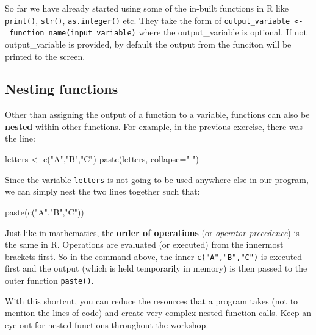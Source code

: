 \documentclass[a4paper]{book}
\newenvironment{Shaded}{}{}
\newcommand{\KeywordTok}[1]{\textcolor[rgb]{0.00,0.00,1.00}{{#1}}}
\newcommand{\DataTypeTok}[1]{{#1}}
\newcommand{\StringTok}[1]{\textcolor[rgb]{0.00,0.50,0.50}{{#1}}}
\newcommand{\NormalTok}[1]{{#1}}
\newlength{\leftbarwidth}
\newlength{\leftbarsep}
\newcommand*{\leftbarcolorcmd}{\color{darkgray}}%
\renewenvironment{leftbar}{%
    \def\FrameCommand{{\leftbarcolorcmd{\vrule width \leftbarwidth\relax\hspace {\leftbarsep}}}}%
    \MakeFramed {\advance \hsize -\width \FrameRestore }%
}{%
    \endMakeFramed
}
\renewenvironment{Shaded}
{\vspace{0em}\begin{leftbar}\begin{snugshade}}
{\end{snugshade}\end{leftbar}\vspace{0pt}}
\begin{document}
So far we have already started using some of the in-built functions in R
like \texttt{print()}, \texttt{str()}, \texttt{as.integer()} etc. They
take the form of
\texttt{output\_variable\ \textless{}-\ function\_name(input\_variable)}
where the output\_variable is optional. If not output\_variable is
provided, by default the output from the funciton will be printed to the
screen.

\subsection{Nesting functions}\label{nesting-functions}

Other than assigning the output of a function to a variable, functions
can also be \textbf{nested} within other functions. For example, in the
previous exercise, there was the line:

\begin{Shaded}
\begin{Highlighting}[]
\NormalTok{letters <-}\StringTok{ }\KeywordTok{c}\NormalTok{(}\StringTok{"A"}\NormalTok{,}\StringTok{"B"}\NormalTok{,}\StringTok{"C"}\NormalTok{)}
\KeywordTok{paste}\NormalTok{(letters, }\DataTypeTok{collapse=}\StringTok{" "}\NormalTok{)}
\end{Highlighting}
\end{Shaded}

Since the variable \texttt{letters} is not going to be used anywhere
else in our program, we can simply nest the two lines together such
that:

\begin{Shaded}
\begin{Highlighting}[]
\KeywordTok{paste}\NormalTok{(}\KeywordTok{c}\NormalTok{(}\StringTok{"A"}\NormalTok{,}\StringTok{"B"}\NormalTok{,}\StringTok{"C"}\NormalTok{))}
\end{Highlighting}
\end{Shaded}

Just like in mathematics, the \textbf{order of operations} (or
\emph{operator precedence}) is the same in R. Operations are evaluated
(or executed) from the innermost brackets first. So in the command
above, the inner \texttt{c("A","B","C")} is executed first and the
output (which is held temporarily in memory) is then passed to the outer
function \texttt{paste()}.

With this shortcut, you can reduce the resources that a program takes
(not to mention the lines of code) and create very complex nested
function calls. Keep an eye out for nested functions throughout the
workshop.
\end{document}
